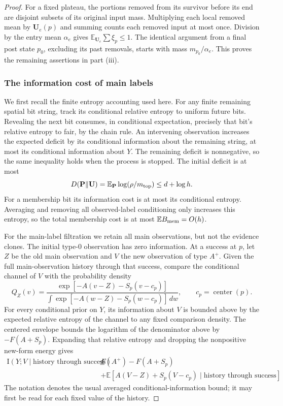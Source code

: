 \begin{proof}
For a fixed plateau, the portions removed from its survivor before
its end are disjoint subsets of its original input mass.  Multiplying
each local removed mean by $\mathbf U_e(p)$ and summing counts each
removed input at most once.  Division by the entry mean $\alpha_e$
gives $\mathbb E_{\mathbf U_e}\sum\xi_p\le1$.  The identical argument
from a final post state $p_0$, excluding its past removals, starts
with mass $m_{p_0}/\alpha_e$.  This proves the remaining assertions
in part \textup{(iii)}.

\subsubsection*{The information cost of main labels}
We first recall the finite entropy accounting used here.  For any
finite remaining spatial bit string, track its conditional relative
entropy to uniform future bits.  Revealing the next bit consumes,
in conditional expectation, precisely that bit's relative entropy
to fair, by the chain rule.  An intervening observation increases
the expected deficit by its conditional information about the
remaining string, at most its conditional information about $Y$.
The remaining deficit is nonnegative, so the same inequality holds
when the process is stopped.  The initial deficit is at most
\[
 D(\mathbf P\|\mathbf U)
   =\mathbb E_{\mathbf P}\log(\rho/m_{\rm top})
   \le d+\log h.
\]
For a membership bit its information cost is at most its conditional
entropy.  Averaging and removing all observed-label conditioning
only increases this entropy, so the total membership cost is at
most $\mathbb E B_{\rm mem}=O(h)$.

For the main-label filtration we retain all main observations, but
not the evidence clones.  The initial type-$0$ observation has zero
information.  At a success at $p$, let $Z$ be the old main
observation and $V$ the new observation of type $A^+$.  Given the
full main-observation history through that success, compare the
conditional channel of $V$ with the probability density
\[
 Q_Z(v)=\frac{\exp[-A(v-Z)-S_p(v-c_p)]}
              {\int\exp[-A(w-Z)-S_p(w-c_p)]\,dw},
       \qquad c_p=\operatorname{center}(p).
\]
For every conditional prior on $Y$, its information about $V$ is
bounded above by the expected relative entropy of the channel to
any fixed comparison density.  The centered envelope bounds the
logarithm of the denominator above by $-F(A+S_p)$.  Expanding that
relative entropy and dropping the nonpositive new-form energy gives
\begin{equation}
 \begin{aligned}
 \mathrm I(Y;V\mid\text{history through success})
 \le{}& F(A^+)-F(A+S_p)\\
 &+\mathbb E[A(V-Z)+S_p(V-c_p)
                         \mid\text{history through success}].
 \end{aligned}
 \label{eq:06-channel-information}
\end{equation}
The notation denotes the usual averaged conditional-information
bound; it may first be read for each fixed value of the history.


\end{proof}
